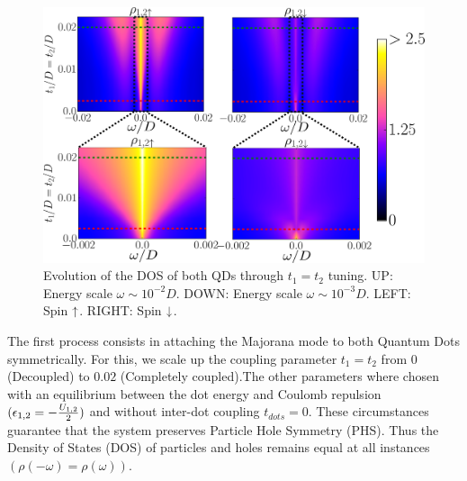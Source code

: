\begin{figure}[hbt]
\centering
\includegraphics[scale=0.35]{IMAGES/t1=t2/2D.png}
\caption{\label{fig:2D/Shift_t1=t2} Evolution of the DOS of both QDs through $t_1 = t_2$ tuning. UP: Energy scale $\omega \sim 10^{-2}D$. DOWN: Energy scale $\omega \sim 10^{-3}D$. LEFT: Spin $\uparrow$. RIGHT: Spin $\downarrow$.}
\end{figure}



The first process consists in attaching the Majorana mode to both Quantum Dots symmetrically. For this, we scale up the coupling parameter $t_1=t_2$ from $0$ (Decoupled) to $0.02$ (Completely coupled).The other parameters where chosen with an equilibrium between the dot energy and Coulomb repulsion $(\epsilon_{1,2}=-\frac{U_{1,2}}{2})$  and  without inter-dot coupling $t_{dots}=0$. These circumstances guarantee that the system preserves Particle Hole Symmetry (PHS). Thus the Density of States (DOS) of particles and holes remains equal at all instances $(\rho(-\omega) = \rho(\omega))$. \\

